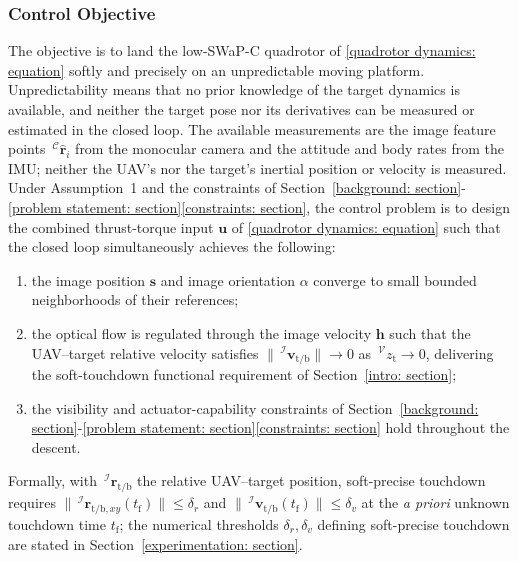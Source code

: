 \documentclass{IEEEtaes}
\begin{document}
\subsubsection{Control Objective} \label{control objective: section}
The objective is to land the low-SWaP-C quadrotor of \eqref{quadrotor dynamics: equation} softly and precisely on an unpredictable moving platform. Unpredictability means that no prior knowledge of the target dynamics is available, and neither the target pose nor its derivatives can be measured or estimated in the closed loop. The available measurements are the image feature points $\,^\mathcal{C}\hat{\boldsymbol{r}}_i$ from the monocular camera and the attitude and body rates from the IMU; neither the UAV's nor the target's inertial position or velocity is measured. Under Assumption~1 and the constraints of Section~\ref{background: section}-\ref{problem statement: section}\ref{constraints: section}, the control problem is to design the combined thrust-torque input $\boldsymbol{u}$ of \eqref{quadrotor dynamics: equation} such that the closed loop simultaneously achieves the following:
\begin{enumerate}
    \item the image position $\boldsymbol{s}$ and image orientation $\alpha$ converge to small bounded neighborhoods of their references;
    \item the optical flow is regulated through the image velocity $\boldsymbol{h}$ such that the UAV--target relative velocity satisfies $\|\,^\mathcal{I}\boldsymbol{v}_\text{t/b}\|\to 0$ as $\,^\mathcal{V}z_\text{t}\to 0$, delivering the soft-touchdown functional requirement of Section~\ref{intro: section};
    \item the visibility and actuator-capability constraints of Section~\ref{background: section}-\ref{problem statement: section}\ref{constraints: section} hold throughout the descent.
\end{enumerate}
Formally, with $\,^\mathcal{I}\boldsymbol{r}_\text{t/b}$ the relative UAV--target position, soft-precise touchdown requires $\|\,^\mathcal{I}\boldsymbol{r}_{\text{t/b},xy}(t_\text{f})\|\le\delta_r$ and $\|\,^\mathcal{I}\boldsymbol{v}_\text{t/b}(t_\text{f})\|\le\delta_v$ at the \emph{a priori} unknown touchdown time $t_\text{f}$; the numerical thresholds $\delta_r,\delta_v$ defining soft-precise touchdown are stated in Section~\ref{experimentation: section}.
\end{document}
